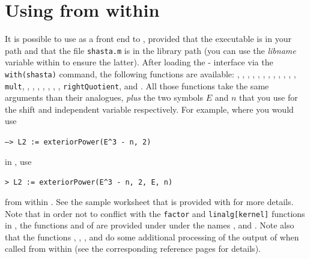 \section{Using \shasta{} from within \maple}
It is possible to use \maple{} as a front end
to \shasta, provided that
the \shasta{} executable is in your path and that the file {\tt shasta.m}
is in the \maple{} library path (you can use the {\em libname} variable within
\maple{} to ensure the latter). After loading the \maple-\shasta{} interface
via the {\tt with(shasta)} command, the following functions are available:
, ,
, ,
, ,
,
,
, ,
,
, {\tt mult},
,
,
,
, ,
, , {\tt rightQuotient},
 and .
All those functions take the
same arguments than their \shasta{} analogues, {\em plus} the two symbols
$E$ and $n$ that you use for the shift and independent variable
respectively. For example, where you would use
\begin{center}
{\tt --> L2 := exteriorPower(E\^{}3 - n, 2)} 
\end{center}
in \shasta, use
\begin{center}
{\tt > L2 := exteriorPower(E\^{}3 - n, 2, E, n)}
\end{center}
from within \maple.
See the sample \maple{} worksheet that is provided with \shasta{} for
more details. Note that in order not to conflict with the
{\tt factor} and {\tt linalg[kernel]} functions in \maple,
the functions  and 
of \shasta{} are provided under \maple{} under the names
,
 and .
Note also that the functions
, ,
,
 and 
do some additional processing of the output of \shasta{}
when called from within \maple{} (see the corresponding reference
pages for details).
